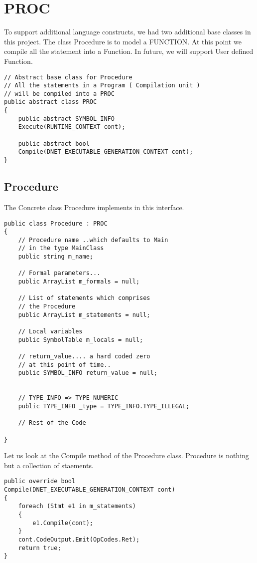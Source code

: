 \section{PROC}
To support additional language constructs, we had two additional base classes in this project. The class Procedure is to model a FUNCTION. At this point we compile all the statement into a Function. In future, we will support User defined Function.
\lstset{style=csharp}
\begin{lstlisting}
// Abstract base class for Procedure
// All the statements in a Program ( Compilation unit )
// will be compiled into a PROC
public abstract class PROC
{
	public abstract SYMBOL_INFO 
	Execute(RUNTIME_CONTEXT cont);
	
	public abstract bool 
	Compile(DNET_EXECUTABLE_GENERATION_CONTEXT cont);
}
\end{lstlisting}
\subsection{Procedure}
The Concrete class Procedure implements in this interface.
\lstset{style=csharp}
\begin{lstlisting}
public class Procedure : PROC
{
	// Procedure name ..which defaults to Main
	// in the type MainClass
	public string m_name;
	
	// Formal parameters...	
	public ArrayList m_formals = null;
		
	// List of statements which comprises 
	// the Procedure
	public ArrayList m_statements = null;

	// Local variables
	public SymbolTable m_locals = null;

	// return_value.... a hard coded zero 
	// at this point of time..
	public SYMBOL_INFO return_value = null;
	

	// TYPE_INFO => TYPE_NUMERIC
	public TYPE_INFO _type = TYPE_INFO.TYPE_ILLEGAL;
	
	// Rest of the Code
	
}
\end{lstlisting}
Let us look at the Compile method of the Procedure class. Procedure is nothing but a collection of staements.

\lstset{style=csharp}
\begin{lstlisting}
public override bool 
Compile(DNET_EXECUTABLE_GENERATION_CONTEXT cont)
{
	foreach (Stmt e1 in m_statements)
	{
		e1.Compile(cont);
	}
	cont.CodeOutput.Emit(OpCodes.Ret);
	return true;
}
\end{lstlisting}

